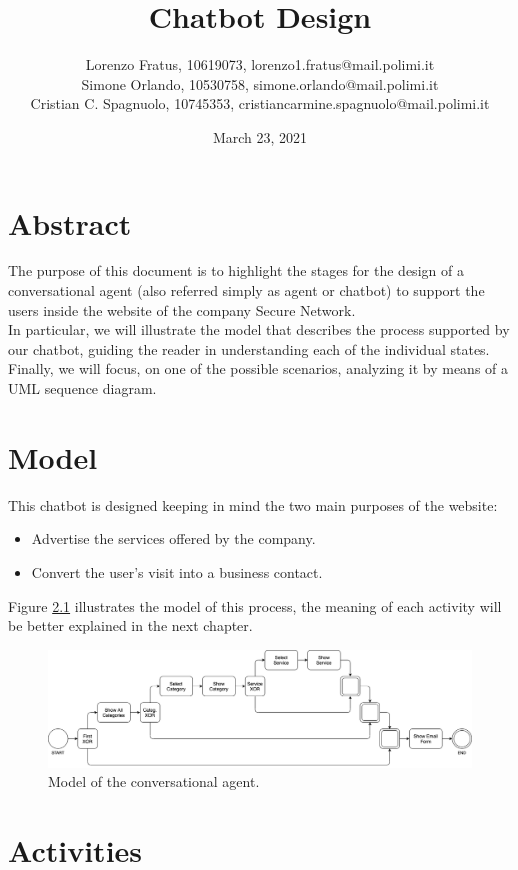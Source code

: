 \documentclass[12pt]{report}
\title{Chatbot Design}
\author{Lorenzo Fratus, 10619073, lorenzo1.fratus@mail.polimi.it \\
Simone Orlando, 10530758, simone.orlando@mail.polimi.it \\
Cristian C. Spagnuolo, 10745353, cristiancarmine.spagnuolo@mail.polimi.it}
\date{March 23, 2021}
\begin{document}
\maketitle
\tableofcontents

\chapter{Abstract}
The purpose of this document is to highlight the stages for the 
design of a conversational agent (also referred simply as agent or chatbot) to support 
the users inside the website of the company Secure Network.\\
In particular, we will illustrate the model that describes the process
supported by our chatbot, guiding the reader in understanding each of
the individual states.\\
Finally, we will focus, on one of the possible scenarios, analyzing
it by means of a UML sequence diagram.

\chapter{Model}
This chatbot is designed keeping in mind the two main purposes of the
website:
\begin{itemize}
	\item Advertise the services offered by the company.
	\item Convert the user's visit into a business contact. 
\end{itemize}

Figure \ref{fig:model} illustrates the model of this process, the 
meaning of each activity will be better explained in the next chapter.

\begin{figure}[h]
	\centering
	\includegraphics[width=\textwidth]{model}
	\caption{Model of the conversational agent.}
	\label{fig:model}
\end{figure}

\chapter{Activities}
\end{document}
